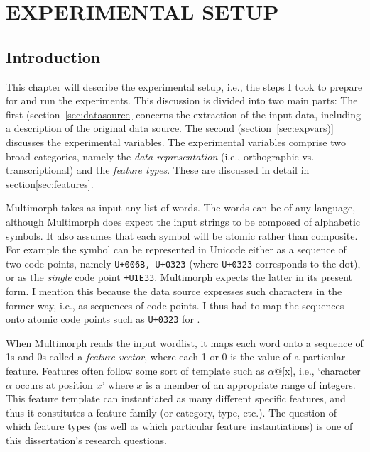 \chapter{EXPERIMENTAL SETUP}
\label{ch:experi}
\section{Introduction}
This chapter will describe the experimental setup, i.e., the steps I took to prepare for and run the experiments. This discussion
is divided into two main parts: The first (section~\ref{sec:datasource} concerns the extraction of the input data, including a description of the original data source. The second (section~\ref{sec:expvars)} discusses the experimental variables. The experimental variables comprise two broad categories, namely the \emph{data representation} (i.e., orthographic vs. transcriptional) and the \emph{feature types}. These are discussed in detail in section\ref{sec:features}. 


Multimorph takes as input any list of words. The words can be of any
language, although Multimorph does expect the input strings to be composed
of alphabetic symbols. It also assumes that each symbol will be atomic rather 
than composite. 
For example the symbol \textsf{} can be represented in Unicode either 
as a sequence of two code points, namely \texttt{U+006B, U+0323} 
(where \texttt{U+0323}
corresponds to the dot), or as the \emph{single} code point \texttt{+U1E33}. 
Multimorph 
expects the latter in its present form. I mention this because the data source 
expresses
such characters in the former way, i.e., as sequences of code points. I thus had
to map the sequences onto atomic code points such as \texttt{U+0323} 
for \textsf{}.

When Multimorph reads the input wordlist, 
it maps each word onto
a sequence of 1s and 0s called a \emph{feature vector}, 
where each 1 or 0 is the value of a
particular feature. 
Features often follow some sort of template such as $\alpha$@[x], i.e., `character $\alpha$ occurs at position $x$' where $x$ is a member of an appropriate range of integers. This feature template can instantiated as many different specific features, and thus it constitutes a feature family (or category, type, etc.). The question of which feature types (as well as which particular feature instantiations) is one of this dissertation's research questions. 

